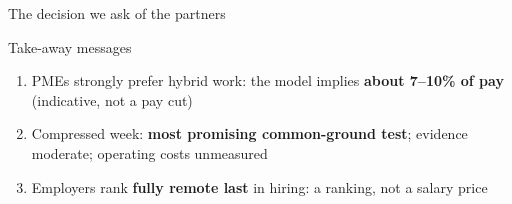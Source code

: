 \begin{frame}[t,label=M-conclusion]{The decision we ask of the partners}
  \FrameTop
  \vspace{0.20cm}%
  \begin{alertblock}{Take-away messages}
    \begin{enumerate}\setlength{\itemsep}{0.12cm}
      \item PMEs strongly prefer hybrid work: the model implies \textbf{about 7--10\% of pay} (indicative, not a pay cut)
      \item Compressed week: \textbf{most promising common-ground test}; evidence moderate; operating costs unmeasured
      \item Employers rank \textbf{fully remote last} in hiring: a ranking, not a salary price
    \end{enumerate}
  \end{alertblock}
\end{frame}
